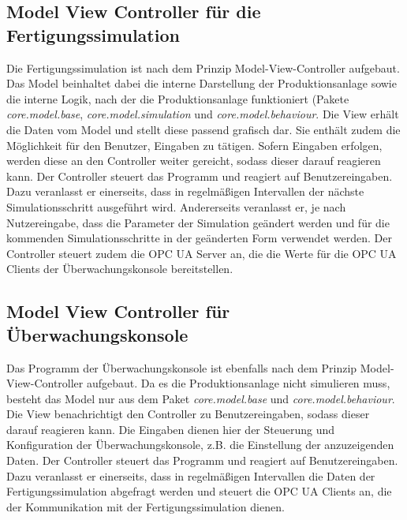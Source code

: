 \documentclass[parskip=full]{scrartcl}
\begin{document}
\subsection{Model View Controller f\"ur die Fertigungssimulation}
\label{mvc}
Die Fertigungssimulation ist nach dem Prinzip Model-View-Controller aufgebaut.
Das Model beinhaltet dabei die interne Darstellung der Produktionsanlage sowie die interne Logik, nach der die Produktionsanlage funktioniert
(Pakete \emph{core.model.base}, \emph{core.model.simulation} und \emph{core.model.behaviour}.
Die View erh\"alt die Daten vom Model und stellt diese passend grafisch dar. Sie enth\"alt zudem die M\"oglichkeit f\"ur den Benutzer, Eingaben zu
t\"atigen. Sofern Eingaben erfolgen, werden diese an den Controller weiter gereicht, sodass dieser darauf reagieren kann.
Der Controller steuert das Programm und reagiert auf Benutzereingaben. Dazu veranlasst er einerseits, dass in regelm\"a{\ss}igen Intervallen der
n\"achste Simulationsschritt ausgef\"uhrt wird. Andererseits veranlasst er, je nach Nutzereingabe, dass die Parameter der Simulation ge\"andert werden
und f\"ur die kommenden Simulationsschritte in der ge\"anderten Form verwendet werden. Der Controller steuert zudem die OPC UA Server an, die die
Werte f\"ur die OPC UA Clients der \"Uberwachungskonsole bereitstellen.

\subsection{Model View Controller f\"ur \"Uberwachungskonsole}
Das Programm der \"Uberwachungskonsole ist ebenfalls nach dem Prinzip Model-View-Controller aufgebaut.
Da es die Produktionsanlage nicht simulieren muss, besteht das Model nur aus dem Paket \emph{core.model.base} und \emph{core.model.behaviour}.
Die View benachrichtigt den Controller zu Benutzereingaben, sodass dieser darauf reagieren kann. Die Eingaben dienen hier der Steuerung und Konfiguration
der \"Uberwachungskonsole, z.B. die Einstellung der anzuzeigenden Daten.
Der Controller steuert das Programm und reagiert auf Benutzereingaben. Dazu veranlasst er einerseits, dass in regelm\"a{\ss}igen Intervallen die Daten der
Fertigungssimulation abgefragt werden und steuert die OPC UA Clients an, die der Kommunikation mit der Fertigungssimulation dienen.

\pagebreak
\end{document}
